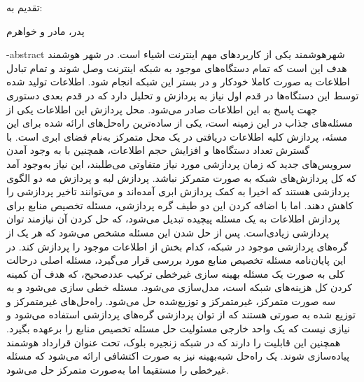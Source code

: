 \cleartorightpage
\esalatPage

\cleartorightpage
\thispagestyle{empty}
{\Large تقدیم به:} \\
\begin{flushleft}
  {
    \huge
    پدر، مادر و خواهرم
  }
\end{flushleft}

\cleartorightpage
{}

\fa-abstract{
	شهرهوشمند یکی از کاربردهای مهم اینترنت اشیاء است. در شهر هوشمند هدف این است که تمام دستگاه‌های موجود به شبکه اینترنت وصل شوند و تمام تبادل اطلاعات به صورت کاملا خودکار و در بستر این شبکه انجام شود. اطلاعات تولید شده توسط این دستگاه‌ها در قدم اول نیاز به پردازش و تحلیل دارد که در قدم بعدی دستوری جهت پاسخ به این اطلاعات صادر می‌شود. 
	محل پردازش این اطلاعات یکی از مسئله‌های جذاب در این زمینه است، یکی از ساده‌ترین راه‌حل‌های ارائه شده برای این مسئه، پردازش کلیه‌ اطلاعات دریافتی در یک محل متمرکز به‌نام فضای ابری است. با گسترش تعداد دستگاه‌ها و افزایش حجم اطلاعات، همچنین با به وجود آمدن سرویس‌های جدید که زمان پردازشی مورد نیاز متفاوتی می‌طلبند، این نیاز به‌وجود آمد که کل پردازش‌های شبکه به صورت متمرکز نباشد. 
	پردازش لبه و پردازش مه دو الگوی پردازشی هستند که اخیرا به کمک پردازش ابری آمده‌اند و می‌توانند تاخیر پردازشی را کاهش دهند. اما با اضافه کردن این دو طیف گره پردازشی، مسئله تخصیص منابع برای پردازش اطلاعات به یک مسئله پیچیده تبدیل می‌شود، که حل کردن آن نیازمند توان پردازشی زیادی‌است. پس از حل شدن این مسئله مشخص می‌شود که هر یک از گره‌های پردازشی موجود در شبکه، کدام بخش از اطلاعات موجود را پردازش کند. 
	در این پایان‌نامه مسئله تخصیص منابع مورد بررسی قرار می‌گیرد، مسئله اصلی درحالت کلی به صورت یک مسئله بهینه سازی غیرخطی ترکیب عددصحیح، که هدف آن کمینه کردن کل هزینه‌های شبکه است، مدل‌سازی می‌شود.  	
	مسئله خطی سازی می‌شود و به سه صورت متمرکز، غیرمتمرکز و توزیع‌شده حل می‌شود. راه‌حل‌های غیرمتمرکز و توزیع شده به صورتی هستند که از توان پردازشی گره‌های پردازشی استفاده می‌شود و نیازی نیست که یک واحد خارجی مسئولیت حل مسئله تخصیص منابع را برعهده بگیرد. همچنین این قابلیت را دارند که در شبکه زنجیره‌ بلوک، تحت عنوان قرارداد هوشمند پیاده‌سازی شوند.
	یک راه‌حل شبه‌بهینه نیز به صورت اکتشافی ارائه می‌شود که مسئله غیرخطی را مستقیما اما به‌صورت متمرکز حل می‌شود. 
}

\cleartorightpage
\abstractPage

\cleartorightpage
